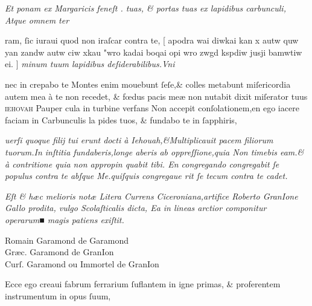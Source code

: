 \documentclass{article}
\newcommand{\threecolumntypefacenames}[3]{\begin{multicols}{3}
		\tiny
		\hfill \qquad \qquad \qquad \qquad #1\hspace*{\fill}\\
		\columnbreak
		\hfill #2\hspace*{\fill}\\
		\columnbreak
		\hfill #3\qquad \qquad \qquad \qquad \hspace*{\fill}
\end{multicols}}
\begin{document}
{\begin{multicols}{2}
	\columnbreak
	\justifying
	\noindent
	\textit{Et ponam ex {M}argaricis feneſt . tuas, \& portas tuas ex lapidibus carbunculi, Atque omnem ter\linebreak}
\end{multicols}
\fontsize{7}{8}\selectfont
\vspace{-2.5\baselineskip}
\noindent ram, ſic iuraui quod non iraſcar contra te, [ %
		{\grecs apodra wai diwkai kan x autw quw yan zandw autw ciw xkau \kern-1pt"wro kadai boqai opi wro zwgd kspdiw jusji bamwtiw ei\kern-1pt\raisebox{.1ex}{"}.} ] \textit{minum tuum lapidibus deſiderabilibus.Vni\linebreak}
\vspace{-2.55\baselineskip}
\begin{multicols}{2}
	\fontsize{7}{8}\selectfont
	\justifying
	\noindent nec in crepabo te Montes enim mouebunt ſeſe,\& colles metabunt miſericordia autem mea\linebreak
	\`a te non recedet, \& f\oe{}dus pacis me\ae{} non nutabit dixit miſerator tuus \textsc{ iehovah} Pauper\linebreak
	cula in turbine verfans Non accepit conſolationem,en ego iacere faciam in Carbunculis la\linebreak
	pides tuos, \& fundabo te in ſapphiris,

	\columnbreak
	\justifying
	\noindent
	\textit{uerſi quoque filij tui erunt docti \`a Iehouah,\&Multiplicauit pacem filiorum tuorum.In inſtitia\linebreak
	fundaberis,longe aberis ab oppreſſione,quia Non timebis eam.\& \`a contritione quia non appropin\linebreak
	quabit tibi. {E}n congregando congregabit ſe populus contra te abſque {M}e.quiſquis congregaue\linebreak
	rit ſe tecum contra te cadet.}
\end{multicols}
\vspace{-1\baselineskip}
\noindent{}  \normalsize {\large \scalebox{0.7}{☞}} \fontsize{6}{7}\selectfont\textit{Eſt \& h\ae{}c melioris not\ae{} Litera Currens Ciceroniana,artifice Roberto GranIone Gallo prodita, vulgo Scolaſticalis dicta, Ea in lineas arctior componitur operarum■ magis patiens exiſtit.}
\vspace{-1.5\baselineskip}
\threecolumntypefacenames{Romain Garamond de Garamond}{Gr\ae{}c. Garamond de GranIon}{Curſ. Garamond ou Immortel de GranIon}
\vspace{-3\baselineskip}
\begin{multicols}{2}
	\fontsize{6.25}{7}\selectfont
	\justifying
	\noindent \quad Ecce ego creaui fabrum ferrarium ſuflantem in igne primas, \& proferentem instrumentum in opus ſuum,\\


\end{multicols}}
\end{document}
